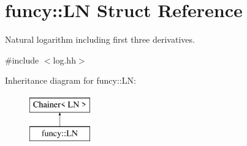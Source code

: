 \hypertarget{structfuncy_1_1LN}{\section{funcy\-:\-:L\-N Struct Reference}
\label{structfuncy_1_1LN}
}


Natural logarithm including first three derivatives.  




{\ttfamily \#include $<$log.\-hh$>$}

Inheritance diagram for funcy\-:\-:L\-N\-:\begin{figure}[H]
\begin{center}
\leavevmode
\includegraphics[height=2.000000cm]{structfuncy_1_1LN}
\end{center}
\end{figure}
